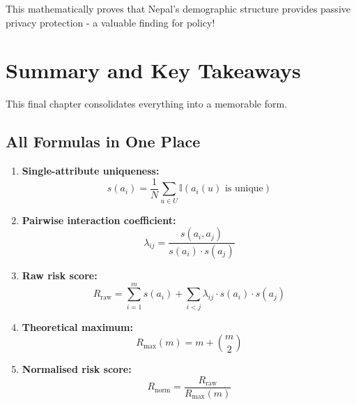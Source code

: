 \documentclass[12pt,a4paper,oneside,openany]{report}
\begin{document}
This mathematically proves that Nepal's demographic structure provides passive privacy protection - a valuable finding for policy!

\chapter{Summary and Key Takeaways}
\label{chap:summary}

This final chapter consolidates everything into a memorable form.

\section{All Formulas in One Place}
\label{sec:formulas}

\begin{enumerate}
    \item \textbf{Single-attribute uniqueness:}
    \begin{equation}
    s(a_i) = \frac{1}{N} \sum_{u \in U} \mathbb{I}\left( a_i(u) \text{ is unique} \right)
    \end{equation}
    
    \item \textbf{Pairwise interaction coefficient:}
    \begin{equation}
    \lambda_{ij} = \frac{s(a_i, a_j)}{s(a_i) \cdot s(a_j)}
    \end{equation}
    
    \item \textbf{Raw risk score:}
    \begin{equation}
    R_{\mathrm{raw}} = \sum_{i=1}^{m} s(a_i) + \sum_{i<j} \lambda_{ij} \cdot s(a_i) \cdot s(a_j)
    \end{equation}
    
    \item \textbf{Theoretical maximum:}
    \begin{equation}
    R_{\mathrm{max}}(m) = m + \binom{m}{2}
    \end{equation}
    
    \item \textbf{Normalised risk score:}
    \begin{equation}
    R_{\mathrm{norm}} = \frac{R_{\mathrm{raw}}}{R_{\mathrm{max}}(m)}
    \end{equation}
\end{enumerate}
\end{document}

